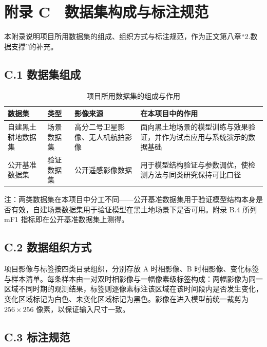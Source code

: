 \setcounter{table}{0}
\renewcommand{\thetable}{C-\arabic{table}}

\section{附录 C　数据集构成与标注规范}

本附录说明项目所用数据集的组成、组织方式与标注规范，作为正文第八章“2.数据支撑”的补充。

\subsection{C.1 数据集组成}

\begin{table}[htbp]
    \centering
    \caption{项目所用数据集的组成与作用}
    \label{tab:ds-compose}
    \small
    \begin{tabular}{|p{3.2cm}|p{2.2cm}|p{3.8cm}|p{5.2cm}|}
        \hline
        \textbf{数据集} & \textbf{类型} & \textbf{影像来源} & \textbf{在本项目中的作用} \\
        \hline
        自建黑土耕地数据集 & 场景数据集 & 高分二号卫星影像、无人机航拍影像 & 面向黑土地场景的模型训练与效果验证，并作为试点应用与系统演示的数据基础 \\
        \hline
        公开基准数据集 & 验证数据集 & 公开遥感影像数据 & 用于模型结构验证与参数调优，使检测方法与同类研究保持可比口径 \\
        \hline
    \end{tabular}
    \par\vspace{2pt}
    {\footnotesize 注：两类数据集在本项目中分工不同——公开基准数据集用于验证模型结构本身是否有效，自建场景数据集用于验证模型在黑土地场景下是否可用。附录 B.4 所列 mF1 指标即在公开基准数据集上测得。}
\end{table}

\subsection{C.2 数据组织方式}

项目影像与标签按四类目录组织，分别存放 A 时相影像、B 时相影像、变化标签与样本清单。每条样本由一对双时相影像与一幅像素级标签构成：两幅影像为同一区域不同时期的观测结果，标签则逐像素标注该区域在该时间段内是否发生变化，变化区域标记为白色、未变化区域标记为黑色。影像在进入模型前统一裁剪为 $256 \times 256$ 像素，以保证输入尺寸一致。

\subsection{C.3 标注规范}

